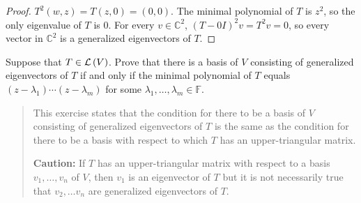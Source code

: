 \begin{proof}
    $T^{2}(w, z) = T(z, 0) = (0, 0)$. The minimal polynomial of $T$ is $z^{2}$, so the only eigenvalue of $T$ is $0$. For every $v\in \mathbb{C}^{2}$, ${(T - 0I)}^{2}v = T^{2}v = 0$, so every vector in $\mathbb{C}^{2}$ is a generalized eigenvectors of $T$.
\end{proof}
\newpage

\begin{exercise}\label{chapter8:sectionA:exercise11}
    Suppose that $T\in\mathcal{L}\left({V}\right)$. Prove that there is a basis of $V$ consisting of generalized eigenvectors of $T$ if and only if the minimal polynomial of $T$ equals $(z - \lambda_{1})\cdots (z - \lambda_{m})$ for some $\lambda_{1}, \ldots, \lambda_{m}\in\mathbb{F}$.
\end{exercise}

\begin{quote}
    This exercise states that the condition for there to be a basis of $V$ consisting
    of generalized eigenvectors of $T$ is the same as the condition for there to be
    a basis with respect to which $T$ has an upper-triangular matrix.

    \textbf{Caution:} If $T$ has an upper-triangular matrix with respect to a basis
    $v_{1}, \ldots, v_{n}$ of $V$, then $v_{1}$ is an eigenvector of $T$ but it is not necessarily true that $v_{2}, \ldots v_{n}$ are generalized eigenvectors of $T$.
\end{quote}

